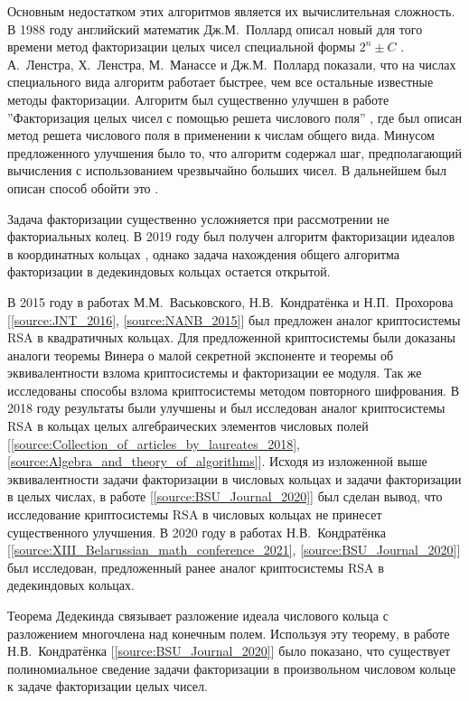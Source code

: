 \documentclass[_00_dissertation.tex]{subfiles}
\begin{document}
Основным недостатком этих алгоритмов является их вычислительная сложность.
В 1988 году английский математик Дж.М.~Поллард описал новый для того времени метод факторизации целых чисел специальной формы $2^n \pm C$ \cite{source:Pollard}.
А.~Ленстра, Х.~Ленстра, М.~Манассе и Дж.М.~Поллард показали, что на числах специального вида алгоритм работает быстрее, чем все остальные известные методы факторизации.
Алгоритм был существенно улучшен в работе ''Факторизация целых чисел с помощью решета числового поля'' \cite{source:Buhler}, где был описан метод решета числового поля в применении к числам общего вида.
Минусом предложенного улучшения было то, что алгоритм содержал шаг, предполагающий вычисления с использованием чрезвычайно больших чисел.
В дальнейшем был описан способ обойти это \cite{source:Couveignes}.

Задача факторизации существенно усложняется при рассмотрении не факториальных колец.
В 2019 году был получен алгоритм факторизации идеалов в координатных кольцах \cite{source:Darkey-Mensah}, однако задача нахождения общего алгоритма факторизации в дедекиндовых кольцах остается открытой.

В 2015 году в работах М.М.~Васьковского, Н.В.~Кондратёнка и Н.П.~Прохорова [\ref{source:JNT_2016}, \ref{source:NANB_2015}] был предложен аналог криптосистемы RSA в квадратичных кольцах.
Для предложенной криптосистемы были доказаны аналоги теоремы Винера о малой секретной экспоненте и теоремы об эквивалентности взлома криптосистемы и факторизации ее модуля.
Так же исследованы способы взлома криптосистемы методом повторного шифрования.
В 2018 году результаты были улучшены и был исследован аналог криптосистемы RSA в кольцах целых алгебраических элементов числовых полей [\ref{source:Collection_of_articles_by_laureates_2018}, \ref{source:Algebra_and_theory_of_algorithms}].
Исходя из изложенной выше эквивалентности задачи факторизации в числовых кольцах и задачи факторизации в целых числах, в работе [\ref{source:BSU_Journal_2020}] был сделан вывод, что исследование криптосистемы RSA в числовых кольцах не принесет существенного улучшения.
В 2020 году в работах Н.В.~Кондратёнка [\ref{source:XIII_Belarussian_math_conference_2021}, \ref{source:BSU_Journal_2020}] был исследован, предложенный ранее аналог криптосистемы RSA в дедекиндовых кольцах.

Теорема Дедекинда связывает разложение идеала числового кольца с разложением многочлена над конечным полем.
Используя эту теорему, в работе Н.В.~Кондратёнка [\ref{source:BSU_Journal_2020}] было показано, что существует полиномиальное сведение задачи факторизации в произвольном числовом кольце к задаче факторизации целых чисел.
\end{document}
